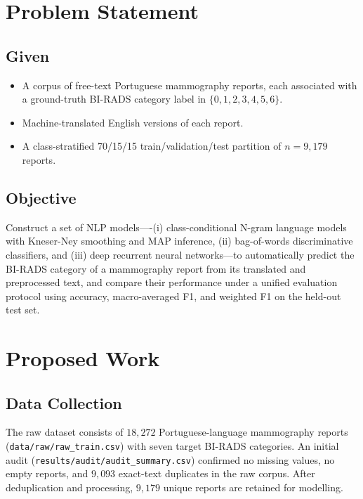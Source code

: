 \documentclass[11pt,a4paper]{article}
\begin{document}
\section{Problem Statement}

\subsection{Given}

\begin{itemize}
  \item A corpus of free-text Portuguese mammography reports, each associated
        with a ground-truth BI-RADS category label in $\{0, 1, 2, 3, 4, 5, 6\}$.
  \item Machine-translated English versions of each report.
  \item A class-stratified 70/15/15 train/validation/test partition of
        $n = 9{,}179$ reports.
\end{itemize}

\subsection{Objective}

Construct a set of NLP models----(i) class-conditional N-gram language models
with Kneser-Ney smoothing and MAP inference, (ii) bag-of-words discriminative
classifiers, and (iii) deep recurrent neural networks---to automatically predict
the BI-RADS category of a mammography report from its translated and
preprocessed text, and compare their performance under a unified evaluation
protocol using accuracy, macro-averaged F1, and weighted F1 on the held-out
test set.

\section{Proposed Work}

\subsection{Data Collection}

The raw dataset consists of $18{,}272$ Portuguese-language mammography reports
(\texttt{data/raw/raw\_train.csv}) with seven target BI-RADS categories.
An initial audit (\texttt{results/audit/audit\_summary.csv}) confirmed no missing
values, no empty reports, and $9{,}093$ exact-text duplicates in the raw corpus.
After deduplication and processing, $9{,}179$ unique reports are retained for
modelling.
\end{document}
